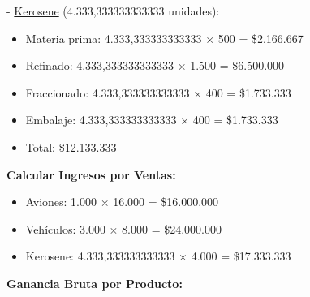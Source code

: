 \documentclass[10pt,a4paper]{article}
\begin{document}
\begin{enumerate}[label=\textbf{\sffamily\large\arabic*.}]
    - \underline{Kerosene} (4.333,333333333333 unidades):

    \begin{itemize}

        \item Materia prima: 4.333,333333333333 × 500 = \$2.166.667
        \item Refinado: 4.333,333333333333 × 1.500 = \$6.500.000
        \item Fraccionado: 4.333,333333333333 × 400 = \$1.733.333
        \item Embalaje: 4.333,333333333333 × 400 = \$1.733.333 \\
        \item Total: \$12.133.333\\

    \end{itemize}

    \textbf{Calcular Ingresos por Ventas:}

    \begin{itemize}

        \item Aviones: 1.000 × 16.000 = \$16.000.000
        \item Vehículos: 3.000 × 8.000 = \$24.000.000
        \item Kerosene: 4.333,333333333333 × 4.000 = \$17.333.333 \\

    \end{itemize}

    \vspace{0.5em}

    \textbf{Ganancia Bruta por Producto:}

    \begin{center}
    \end{center}
    

\end{enumerate}
\end{document}
